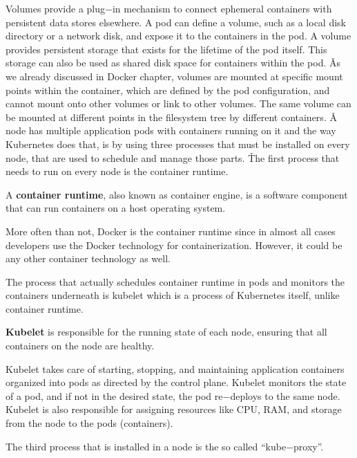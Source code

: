 Volumes provide a plug$-$in mechanism to connect ephemeral containers with persistent data stores elsewhere. A pod
can define a volume, such as a local disk directory or a network disk, and expose it to the containers in the pod. A
volume provides persistent storage that exists for the lifetime of the pod itself. This storage can also be used as
shared disk space for containers within the pod. \v

As we already discussed in Docker chapter, volumes are mounted at specific mount points within the container, which
are defined by the pod configuration, and cannot mount onto other volumes or link to other volumes. The same volume
can be mounted at different points in the filesystem tree by different containers. \v

A node has multiple application pods with containers running on it and the way Kubernetes does that, is by using
three processes that must be installed on every node, that are used to schedule and manage those parts. \v

The first process that needs to run on every node is the container runtime.

A \textbf{container runtime}, also known as container engine, is a software component that can run containers on a host
operating system.
\ed

More often than not, Docker is the container runtime since in almost all cases developers use the Docker technology
for containerization. However, it could be any other container technology as well.


The process that actually schedules container runtime in pods and monitors the containers underneath is kubelet which
is a process of Kubernetes itself, unlike container runtime.

\bd[Kubelet]
\textbf{Kubelet} is responsible for the running state of each node, ensuring that all containers on the node are
healthy.
\ed

Kubelet takes care of starting, stopping, and maintaining application containers organized into pods as directed by
the control plane. Kubelet monitors the state of a pod, and if not in the desired state, the pod re$-$deploys to the
same node. Kubelet is also responsible for assigning resources like CPU, RAM, and storage from the node to the pods
(containers).


The third process that is installed in a node is the so called ``kube$-$proxy''.

